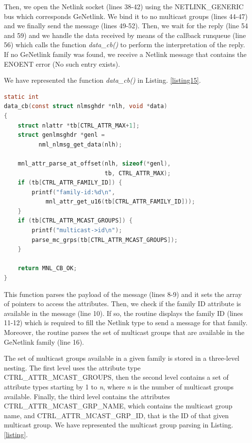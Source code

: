 \documentclass[10pt,onecolumn]{article}
\begin{document}
Then, we open the Netlink socket (lines 38-42) using the NETLINK\_GENERIC bus which corresponds GeNetlink. We bind it to no multicast groups (lines 44-47) and we finally send the message (lines 49-52). Then, we wait for the reply (line 54 and 59) and we handle the data received by means of the callback runqueue (line 56) which calls the function \textit{data\_cb()} to perform the interpretation of the reply. If no GeNetlink family was found, we receive a Netlink message that contains the ENOENT error (No such entry exists).

We have represented the function \textit{data\_cb()} in Listing. \ref{listing15}.

\begin{lstlisting}[language=C, caption=Digesting GeNetlink control messages, label=listing15]
static int
data_cb(const struct nlmsghdr *nlh, void *data)
{
    struct nlattr *tb[CTRL_ATTR_MAX+1];
    struct genlmsghdr *genl = 
          nml_nlmsg_get_data(nlh);

    mnl_attr_parse_at_offset(nlh, sizeof(*genl),
                             tb, CTRL_ATTR_MAX);
    if (tb[CTRL_ATTR_FAMILY_ID]) {
        printf("family-id:%d\n",
            mnl_attr_get_u16(tb[CTRL_ATTR_FAMILY_ID]));
    }
    if (tb[CTRL_ATTR_MCAST_GROUPS]) {
        printf("multicast->id\n");
        parse_mc_grps(tb[CTRL_ATTR_MCAST_GROUPS]);
    }

    return MNL_CB_OK;
}
\end{lstlisting}

This function parses the payload of the message (lines 8-9) and it sets the array of pointers to access the attributes. Then, we check if the family ID attribute is available in the message (line 10). If so, the routine displays the family ID (lines 11-12) which is required to fill the Netlink type to send a message for that family. Moreover, the routine parses the set of multicast groups that are available in the GeNetlink family (line 16).

The set of multicast groups available in a given family is stored in a three-level nesting. The first level uses the attribute type CTRL\_ATTR\_MCAST\_GROUPS, then the second level contains a set of attribute types starting by 1 to \textit{n}, where \textit{n} is the number of multicast groups available. Finally, the third level contains the attributes CTRL\_ATTR\_MCAST\_GRP\_NAME, which contains the multicast group name, and CTRL\_ATTR\_MCAST\_GRP\_ID, that is the ID of that given multicast group. We have represented the multicast group parsing in Listing. \ref{listing}.
\end{document}
